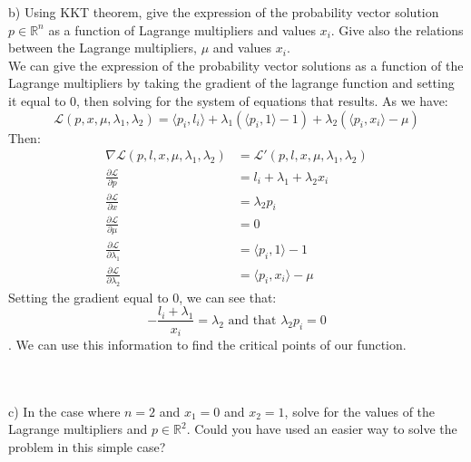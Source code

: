 \documentclass[12pt,twoside]{article}
\newcommand{\R}{\mathbb{R}}
\newcommand{\Lagr}{\mathcal{L}}
\begin{document}
b) Using KKT theorem, give the expression of the probability vector solution $p \in \R^n$ as a function of Lagrange multipliers and values $x_i$. Give also the relations between the Lagrange multipliers, $\mu$ and values $x_i$.\\
We can give the expression of the probability vector solutions as a function of the Lagrange multipliers by taking the gradient of the lagrange function and setting it equal to 0, then solving for the system of equations that results.
As we have: 
$$
    \Lagr (p,x,\mu, \lambda_1,\lambda_2) = \langle p_i, l_i \rangle + 
    \lambda_1(\langle p_i, 1 \rangle -1) + \lambda_2(\langle p_i, x_i \rangle -\mu)
$$
Then: 
\begin{equation}
    \begin{split}
        \nabla \Lagr (p,l,x,\mu, \lambda_1,\lambda_2) &=  \Lagr' (p,l,x,\mu, \lambda_1,\lambda_2)\\
        \frac{\partial \Lagr}{\partial p} &= l_i + \lambda_1 + \lambda_2 x_i \\
        \frac{\partial \Lagr}{\partial x} &= \lambda_2 p_i \\
        \frac{\partial \Lagr}{\partial \mu} &= 0 \\
        \frac{\partial \Lagr}{\partial \lambda_1} &= \langle p_i, 1 \rangle -1 \\
        \frac{\partial \Lagr}{\partial \lambda_2} &= \langle p_i, x_i \rangle -\mu
    \end{split}
\end{equation}
Setting the gradient equal to 0, we can see that:
$$-\frac{l_i+\lambda_1}{x_i} = \lambda_2 \text{ and that } \lambda_2 p_i = 0$$
. We can use this information to find the critical points of our function.  

\begin{equation}
    \begin{split}
        
    \end{split}
\end{equation}

\\
c) In the case where $n=2$ and $x_1=0$ and $x_2=1$, solve for the values of the Lagrange multipliers and $p \in \R^2$. Could you have used an easier way to solve the problem in this simple case?
\end{document}
